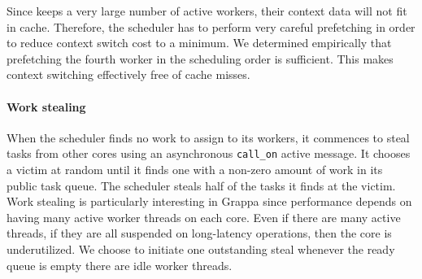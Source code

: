 Since \Grappa keeps a very large number of active workers, their context data will not fit in cache. Therefore, the scheduler has to perform very careful prefetching in order to reduce context switch cost to a minimum. We determined empirically that prefetching the fourth worker in the scheduling order is sufficient. This makes context switching effectively free of cache misses. 

% 
% 
% 






\paragraph{Work stealing} 
When the scheduler finds no work to assign to its workers, it commences to
steal tasks from other cores using an asynchronous \texttt{call\_on} active
message. It chooses a victim at random until it finds one with a non-zero
amount of work in its public task queue. The scheduler steals half of the
tasks it finds at the victim. Work stealing is particularly interesting in
Grappa since performance depends on having many active worker threads on each
core. Even if there are many active threads, if they are all suspended on
long-latency operations, then the core is underutilized. We choose to initiate
one outstanding steal whenever the ready queue is empty there are idle worker
threads.

